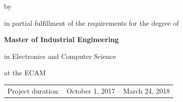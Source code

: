 \begin{titlepage}

\begin{center}


\vspace*{2\bigskipamount}

{\makeatletter
\titlestyle\color{tudelft-cyan}\Huge\@title
\makeatother}

{\makeatletter
\ifx\@subtitle\undefined\else
    \bigskip
    \titlefont\titleshape\LARGE\@subtitle
\fi
\makeatother}

\bigskip
\bigskip

by

\bigskip
\bigskip

{\makeatletter
\titlefont\Large\bfseries\@author
\makeatother}

\vfill

in partial fulfillment of the requirements for the degree of

\bigskip
\bigskip

{\bfseries Master of Industrial Engineering}

in Electronics and Computer Science

\bigskip
\bigskip

at the ECAM


\vfill

\begin{tabular}{lll}
    Project duration: & \multicolumn{2}{l}{October 1, 2017 -- March 24, 2018} \\
    

\end{tabular}
\end{center}
\end{titlepage}

